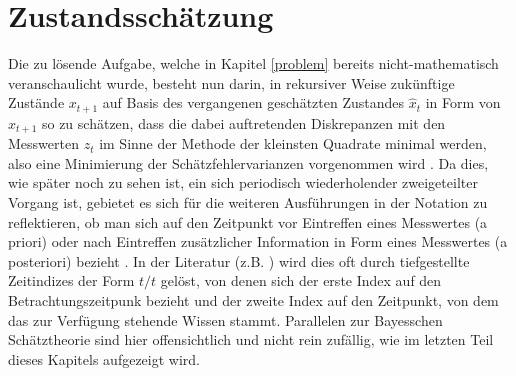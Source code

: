 \documentclass[12pt,a4paper,headsepline,bibliography=totoc,listof=totoc,headinclude=false,footinclude=false,BCOR5mm]{scrreprt} %
\begin{document}
\section{Zustandssch{\"a}tzung}
Die zu l{\"o}sende Aufgabe, welche in Kapitel \ref{problem} bereits nicht-mathematisch veranschaulicht wurde, besteht nun darin, in rekursiver Weise zuk{\"u}nftige Zust{\"a}nde $x_{t+1}$  auf Basis des vergangenen gesch{\"a}tzten Zustandes $\hat{x}_t$ in Form von $\hat{x}_{t+1}$ so zu sch{\"a}tzen, dass die dabei auftretenden Diskrepanzen mit den Messwerten $z_t$ im Sinne der Methode der kleinsten Quadrate minimal werden, also eine Minimierung der Sch{\"a}tzfehlervarianzen vorgenommen wird \cite{Anderson1992}. Da dies, wie sp{\"a}ter noch zu sehen ist, ein sich periodisch wiederholender zweigeteilter Vorgang ist, gebietet es sich f{\"u}r die weiteren Ausf{\"u}hrungen in der Notation zu reflektieren, ob man sich auf den Zeitpunkt vor Eintreffen eines Messwertes (a priori) oder nach Eintreffen zus{\"a}tzlicher Information in Form eines Messwertes (a posteriori) bezieht \cite[S.2]{Welch2006}. In der Literatur (z.B. \cite{Sorenson1970}) wird dies oft durch tiefgestellte Zeitindizes der Form $t / t$ gel{\"o}st, von denen sich der erste Index auf den Betrachtungszeitpunk bezieht und der zweite Index auf den Zeitpunkt, von dem das zur Verf{\"u}gung stehende Wissen stammt. Parallelen zur Bayesschen Sch{\"a}tztheorie sind hier offensichtlich und nicht rein zuf{\"a}llig, wie im letzten Teil dieses Kapitels aufgezeigt wird. 
\end{document}
